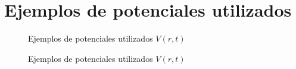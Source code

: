 \section{Ejemplos de potenciales utilizados}

\begin{figure}[H]
  \centering
  \caption{Ejemplos de potenciales utilizados $V(r,t)$}
\end{figure}

\begin{figure}[H]
  \centering
  \caption{Ejemplos de potenciales utilizados $V(r,t)$}
\end{figure}





